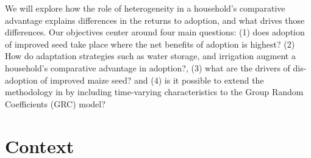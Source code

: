 \documentclass{article}
\begin{document}
We will explore how the role of heterogeneity in a household’s comparative advantage explains differences in the returns to adoption, and what drives those differences. Our objectives center around four main questions: (1) does adoption of improved seed take place where the net benefits of adoption is highest? (2) How do adaptation strategies such as water storage, and irrigation augment a household’s comparative advantage in adoption?, (3) what are the drivers of dis-adoption of improved maize seed? and (4) is it possible to extend the methodology in \citep{Tjernstrom_Emilia_Dalia_Ghanem_Oscar_Barriga_Cabanillas_Travis_J_Lybbert_Jeffrey_D_Michler_and_Aleksandr_Michuda2020-bc} by including time-varying characteristics to the Group Random Coefficients (GRC) model?

\section{Context}
\end{document}
